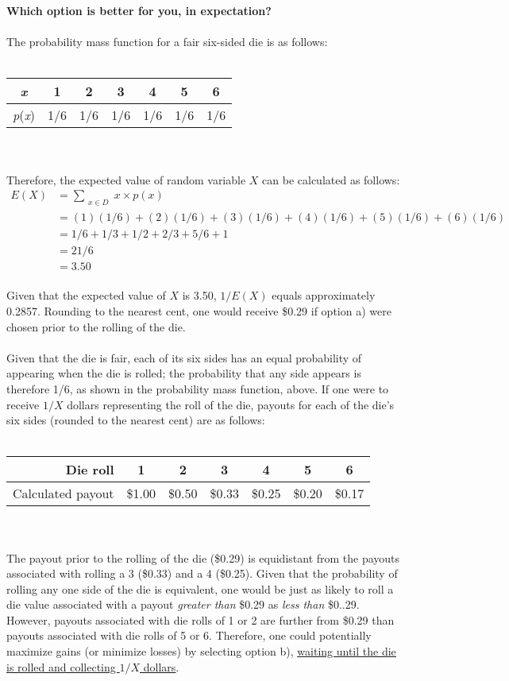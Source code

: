 \documentclass[12pt,a4paper]{article}
\numberwithin{equation}{subsection}
\def\doubleunderline#1{\underline{\underline{#1}}}
\begin{document}
\begin{enumerate}
\textbf{Which option is better for you, in expectation?} \\ \\
The probability mass function for a fair six-sided die is as follows: \\ \\
\begin{tabular}{c|cccccc}
\textit{x} & 1 & 2 & 3 & 4 & 5 & 6 \\
\hline
\textit{p}(\textit{x}) & 1/6 & 1/6 & 1/6 & 1/6 & 1/6 & 1/6 \\
\end{tabular} \\ \\
Therefore, the expected value of random variable $X$ can be calculated as follows:
\begin{equation*}
\begin{split}
E(X) & = \sum_{\substack{x \in D}}x \times p(x) \\
& = (1)(1/6) + (2)(1/6) + (3)(1/6) + (4)(1/6) + (5)(1/6) + (6)(1/6)\\
& = 1/6 + 1/3 + 1/2 + 2/3 + 5/6 + 1 \\
& = 21/6 \\
& = 3.50
\end{split}
\end{equation*} \\
Given that the expected value of $X$ is 3.50, $1/E(X)$ equals approximately 0.2857.  Rounding to the nearest cent, one would receive \$0.29 if option a) were chosen prior to the rolling of the die. \\ \\
Given that the die is fair, each of its six sides has an equal probability of appearing when the die is rolled; the probability that any side appears is therefore 1/6, as shown in the probability mass function, above.  If one were to receive $1/X$ dollars representing the roll of the die, payouts for each of the die's six sides (rounded to the nearest cent) are as follows: \\ \\
\begin{tabular}{r|cccccc}
Die roll & 1 & 2 & 3 & 4 & 5 & 6 \\
\hline
Calculated payout & \$1.00 & \$0.50 & \$0.33 & \$0.25 & \$0.20 & \$0.17 \\
\end{tabular} \\ \\
The payout prior to the rolling of the die (\$0.29) is equidistant from the payouts associated with rolling a 3 (\$0.33) and a 4 (\$0.25).  Given that the probability of rolling any one side of the die is equivalent, one would be just as likely to roll a die value associated with a payout \textit{greater than} \$0.29 as \textit{less than} \$0..29.  However, payouts associated with die rolls of 1 or 2 are further from \$0.29 than payouts associated with die rolls of 5 or 6.  Therefore, one could potentially maximize gains (or minimize losses) by selecting option b), \doubleunderline{waiting until the die is rolled and collecting $1/X$ dollars}. \\


\end{enumerate}
\end{document}
